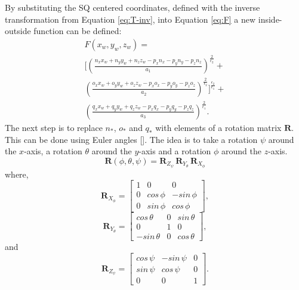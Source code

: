 By substituting the \gls{SQ} centered coordinates, defined with the inverse transformation from Equation \ref{eq:T-inv}, into Equation \ref{eq:F} a new inside-outside function can be defined:
\begin{multline}
F(x_w, y_w, z_w) = \\ \Bigg[ \left( \frac{n_x x_w + n_y y_w + n_z z_w - p_x n_x - p_y n_y - p_z n_z}{a_1} \right)^{\frac{2}{\epsilon_2}} + \\ \left(\frac{o_x x_w + o_y y_w + o_z z_w - p_x o_x - p_y o_y - p_z o_z}{a_2}\right)^{\frac{2}{\epsilon_2}}  \Bigg]^{\frac{\epsilon_2}{\epsilon_1}} + \\ \left(\frac{q_x x_w + q_y y_w + q_z z_w - p_x q_x - p_y q_y - p_z q_z}{a_3}\right)^{\frac{2}{\epsilon_1}}.
\label{eq:transformedIOF}
\end{multline}
The next step is to replace $n_*$, $o_*$ and $q_*$ with elements of a rotation matrix $\textbf{R}$. This can be done using Euler angles [\citeauthor{Siciliano2016}]. The idea is to take a rotation $\psi$ around the $x$-axis, a rotation $\theta$ around the $y$-axis and a rotation $\phi$ around the $z$-axis.
\begin{equation}
	\textbf{R}(\phi,\theta,\psi) = \textbf{R}_{Z_{\psi}}\,\textbf{R}_{Y_{\theta}}\,\textbf{R} _{X_{\phi}}
	\label{eq:RotSQ}
\end{equation}
where,
\begin{equation}
\textbf{R}_{X_{\phi}} = \begin{bmatrix}
1 & 0 & 0 \\ 0 & cos\,\phi & -sin\,\phi \\ 0 & sin\,\phi & cos\,\phi
\end{bmatrix},
\end{equation}
\begin{equation}
\textbf{R}_{Y_{\theta}} = \begin{bmatrix}
cos\,\theta & 0 & sin\,\theta \\ 0 & 1 & 0 \\ -sin\,\theta & 0 & cos\,\theta
\end{bmatrix},
\end{equation}
and
\begin{equation}
\textbf{R}_{Z_{\psi}} = \begin{bmatrix}
cos\,\psi & -sin\,\psi & 0 \\ sin\,\psi & cos\,\psi & 0 \\ 0 & 0 & 1
\end{bmatrix}.
\end{equation}
